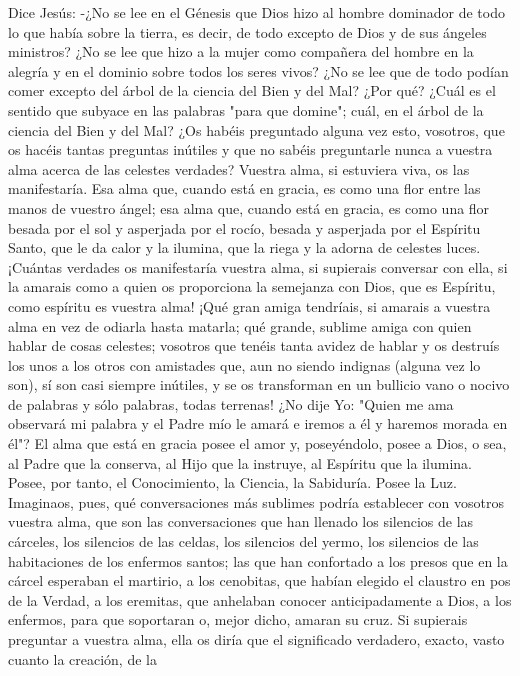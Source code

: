 \documentclass[12pt]{book} %
\begin{document}
Dice Jesús: 
-¿No se lee en el Génesis que Dios hizo al hombre dominador de todo lo que había sobre la tierra, es decir, de todo excepto de Dios y de sus ángeles ministros? ¿No se lee que hizo a la mujer como compañera del hombre en la alegría y en el dominio sobre todos los seres vivos? ¿No se lee que de todo podían comer excepto del árbol de la ciencia del Bien y del Mal? ¿Por qué? ¿Cuál es el sentido que subyace en las palabras "para que domine"; cuál, en el árbol de la ciencia del Bien y del Mal? ¿Os habéis preguntado alguna vez esto, vosotros, que os hacéis tantas preguntas inútiles y que no sabéis preguntarle nunca a vuestra alma acerca de las celestes verdades? 
Vuestra alma, si estuviera viva, os las manifestaría. Esa alma que, cuando está en gracia, es como una flor entre las 
manos de vuestro ángel; esa alma que, cuando está en gracia, es como una flor besada por el sol y asperjada por el rocío, besada y asperjada por el Espíritu Santo, que le da calor y la ilumina, que la riega y la adorna de celestes luces. ¡Cuántas verdades os manifestaría vuestra alma, si supierais conversar con ella, si la amarais como a quien os proporciona la semejanza con Dios, que es Espíritu, como espíritu es vuestra alma! ¡Qué gran amiga tendríais, si amarais a vuestra alma en vez de odiarla hasta matarla; qué grande, sublime amiga con quien hablar de cosas celestes; vosotros que tenéis tanta avidez de hablar y os destruís los unos a los otros con amistades que, aun no siendo indignas (alguna vez lo son), sí son casi siempre inútiles, y se os transforman en un bullicio vano o nocivo de palabras y sólo palabras, todas terrenas! 
¿No dije Yo: "Quien me ama observará mi palabra y el Padre mío le amará e iremos a él y haremos morada en él"? El 
alma que está en gracia posee el amor y, poseyéndolo, posee a Dios, o sea, al Padre que la conserva, al Hijo que la instruye, al Espíritu que la ilumina. Posee, por tanto, el Conocimiento, la Ciencia, la Sabiduría. Posee la Luz. Imaginaos, pues, qué conversaciones más sublimes podría establecer con vosotros vuestra alma, que son las conversaciones que han llenado los silencios de las cárceles, los silencios de las celdas, los silencios del yermo, los silencios de las habitaciones de los enfermos santos; las que han confortado a los presos que en la cárcel esperaban el martirio, a los cenobitas, que habían elegido el claustro en pos de la Verdad, a los eremitas, que anhelaban conocer anticipadamente a Dios, a los enfermos, para que soportaran o, mejor dicho, amaran su cruz. 
Si supierais preguntar a vuestra alma, ella os diría que el significado verdadero, exacto, vasto cuanto la creación, de la 
\end{document}
